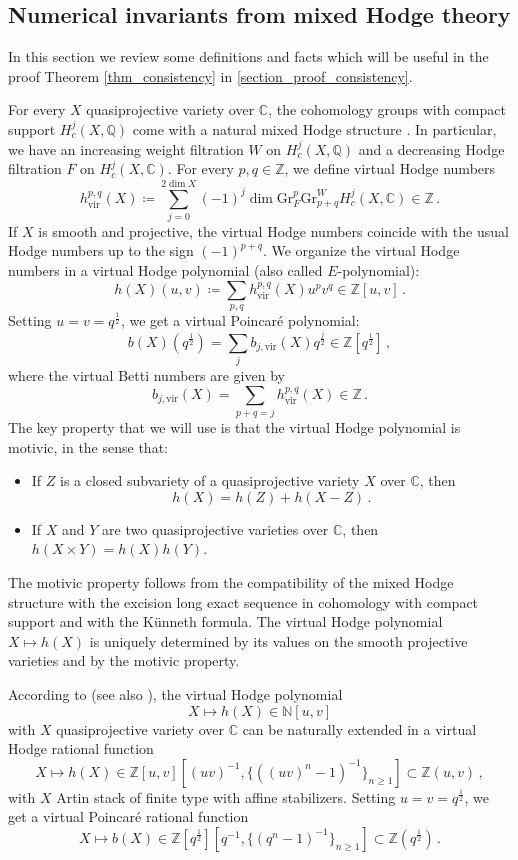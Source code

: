 \documentclass[12pt, a4paper]{amsart}
\newcommand\C{\mathbb C}
\newcommand\NN{\mathbb N}
\newcommand\Q{\mathbb Q}
\newcommand\Z{\mathbb Z}
\begin{document}
\subsection{Numerical invariants from mixed Hodge theory}
\label{section_numerical_mixed_Hodge_theory}
In this section we review some definitions and facts which will be useful in the proof 
Theorem \ref{thm_consistency} in \cref{section_proof_consistency}.


For every $X$ quasiprojective variety over 
$\C$, the cohomology groups with compact support
$H^j_c(X,\Q)$ come with a natural
mixed Hodge structure
\cite{MR0498551, MR0498552}.
In particular, we have an increasing weight filtration $W$ on $H^j_c(X,\Q)$ and a decreasing Hodge filtration $F$ on 
$H^j_c(X,\C)$. For every 
$p, q\in \Z$, we define virtual Hodge numbers 
\[ h^{p,q}_{\mathrm{vir}}(X)\coloneq
\sum_{j=0}^{2 \dim X}
(-1)^j \dim \mathrm{Gr}_F^p
\mathrm{Gr}^W_{p+q} H^j_c(X,\C) \in \Z
\,.\]
If $X$ is smooth and projective, the virtual Hodge numbers coincide with the usual Hodge numbers up to the sign $(-1)^{p+q}$.
We organize the virtual Hodge numbers in a virtual Hodge polynomial (also called $E$-polynomial):
\[ h(X)(u,v)\coloneq \sum_{p,q} h^{p,q}_{\mathrm{vir}}(X) 
u^p v^q \in \Z[u,v]\,.\]
Setting $u=v=q^{\frac{1}{2}}$, we get a virtual Poincar\'e polynomial:
\[ b(X)(q^{\frac{1}{2}})=\sum_j b_{j,\mathrm{vir}}(X)q^{\frac{j}{2}}\in\Z[q^{\frac{1}{2}}]\,,\]
where the virtual Betti numbers are
given by 
\[ b_{j,\mathrm{vir}}(X)=\sum_{p+q=j}
h_{\mathrm{vir}}^{p,q}(X) \in \Z\,.\]
The key property that we will use is that the virtual Hodge polynomial is motivic, in the sense that:
\begin{itemize}
\item[(i)] If $Z$ is a closed subvariety of a quasiprojective variety $X$ over $\C$, then 
\[h(X)=h(Z)+h(X-Z)\,.\]
\item[(ii)] If $X$ and $Y$ are two quasiprojective varieties over $\C$, then
$h(X \times Y)=h(X)h(Y)$.
\end{itemize}
The motivic property follows from the compatibility of the mixed Hodge structure with the excision long exact sequence 
in cohomology with compact support and with the Künneth formula. The virtual Hodge polynomial
$ X \mapsto h(X)$ is uniquely determined 
by its values on the smooth projective varieties and by the motivic property.

According to \cite[Theorem 3.10]{toen2005grothendieck}
(see also \cite{MR2354923}), the 
virtual Hodge polynomial \[X \mapsto h(X) 
\in \NN[u,v]\] with $X$ quasiprojective variety over $\C$ can be naturally extended 
in a virtual Hodge rational function 
\[ X \mapsto h(X) \in 
\Z[u,v][(uv)^{-1},\{((uv)^n-1)^{-1}\}_{n \geqslant 1}] \subset \Z(u,v)\,,\]
with $X$ Artin stack of finite type with 
affine stabilizers.
Setting $u=v=q^{\frac{1}{2}}$, we get a 
virtual Poincar\'e rational function 
\[ X \mapsto b(X) \in \Z[q^{\frac{1}{2}}]
[q^{-1},\{(q^n-1)^{-1}\}_{n\geqslant 1}]
\subset \Z(q^{\frac{1}{2}})\,.\]
\end{document}
